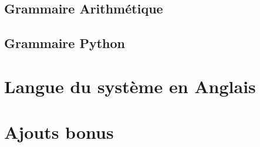 \documentclass[a4paper,12pt]{article}
\begin{document}
	\subsection{Grammaire Arithmétique}
	
	\subsection{Grammaire Python}
	
\section{Langue du système en Anglais}

\section{Ajouts bonus}

	
\end{document}
